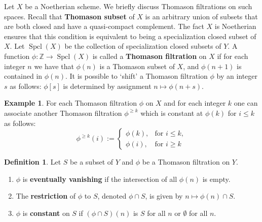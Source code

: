 \documentclass[11pt]{amsart}
\theoremstyle{plain}
\theoremstyle{definition}
\newtheorem{definition}[theorem]{Definition}
\newtheorem{example}[theorem]{Example}
\numberwithin{equation}{section}
\numberwithin{theorem}{section}
\begin{document}
Let $X$ be a Noetherian scheme. We briefly discuss Thomason filtrations on such spaces. Recall that \textbf{Thomason subset} of $X$ is an arbitrary union of subsets that are both closed and have a quasi-compact complement. The fact $X$ is Noetherian ensures that this condition is equivalent to being a specialization  closed subset of $X$. Let $\operatorname{Spcl}(X)$ be the collection of specialization  closed subsets of $Y$. A function $\phi \colon \mathbb{Z} \to \operatorname{Spcl}(X)$ is called a \textbf{Thomason filtration} on $X$ if for each integer $n$ we have that $\phi(n)$ is a Thomason subset of $X$, and $\phi(n+1)$ is contained in $\phi (n)$. It is possible to `shift' a Thomason filtration $\phi$ by an integer $s$ as follows: $\phi[s]$ is determined by assignment $n\mapsto \phi (n+s)$. 


\begin{example}\label{ex:truncate_thomason_filtration}
    For each Thomason filtration $\phi$ on $X$ and for each integer $k$ one can associate another Thomason filtration $\phi^{\geq k}$ which is constant at $\phi (k)$ for $i\leq k$ as follows:
    \begin{displaymath}
        \phi^{\geq k}(i):=\begin{cases}\phi (k),&\text{for }i\leq k,\\ \phi (i),&\text{for } i\geq k\end{cases}
    \end{displaymath}
\end{example}

\begin{definition}
    Let $S$ be a subset of $Y$ and $\phi$ be a Thomason filtration on $Y$.
    \begin{enumerate}
        \item $\phi$ is \textbf{eventually vanishing} if the intersection of all $\phi(n)$ is empty.
        \item The \textbf{restriction} of $\phi$ to $S$, denoted $\phi\cap S$, is given by $n\mapsto \phi (n)\cap S$.
        \item $\phi$ is \textbf{constant} on $S$ if $( \phi \cap S)(n)$ is $S$ for all $n$ or $\emptyset$ for all $n$.
    \end{enumerate}
\end{definition}
\end{document}
